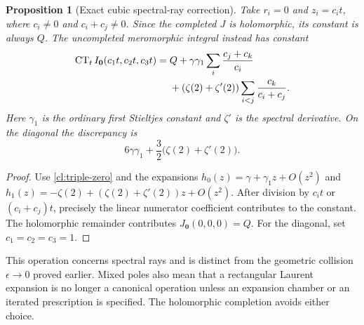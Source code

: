 \documentclass[11pt,a4paper]{article}
\numberwithin{equation}{section}
\newtheorem{proposition}[theorem]{Proposition}
\theoremstyle{definition}
\theoremstyle{remark}
\begin{document}
\begin{proposition}[Exact cubic spectral-ray correction]
\label{cl:rays}
Take $r_i=0$ and $z_i=c_i t$, where $c_i\ne0$ and $c_i+c_j\ne0$.
Since the completed $J$ is holomorphic, its constant is always $Q$.
The uncompleted meromorphic integral instead has constant
\begin{align}
 \operatorname{CT}_{t}I_{\boldsymbol0}(c_1t,c_2t,c_3t)
 ={}&Q+\gamma\gamma_1\sum_i\frac{c_j+c_k}{c_i}\notag\\
       &+(\zeta(2)+\zeta'(2))\sum_{i<j}\frac{c_k}{c_i+c_j}.
       \label{cl:ray-constant}
\end{align}
Here $\gamma_1$ is the ordinary first Stieltjes constant and $\zeta'$
is the spectral derivative. On the diagonal the discrepancy is
\[
 6\gamma\gamma_1+\frac32\bigl(\zeta(2)+\zeta'(2)\bigr).
\]
\end{proposition}
\begin{proof}
Use \eqref{cl:triple-zero} and the expansions
$h_0(z)=\gamma+\gamma_1z+O(z^2)$ and
$h_1(z)=-\zeta(2)+(\zeta(2)+\zeta'(2))z+O(z^2)$.
After division by $c_it$ or $(c_i+c_j)t$, precisely the linear
numerator coefficient contributes to the constant. The holomorphic
remainder contributes $J_{\boldsymbol0}(0,0,0)=Q$. For the diagonal,
set $c_1=c_2=c_3=1$.
\end{proof}
This operation concerns spectral rays and is distinct from the
geometric collision $\epsilon\to0$ proved earlier. Mixed poles also
mean that a rectangular Laurent expansion is no longer a canonical
operation unless an expansion chamber or an iterated prescription is
specified. The holomorphic completion avoids either choice.
\end{document}
